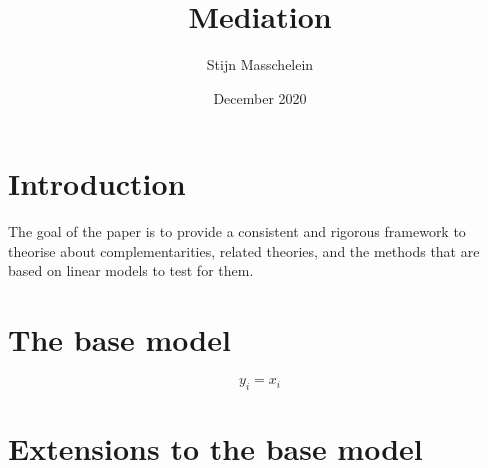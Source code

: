 \documentclass[]{article} %
\title{Mediation}
\author{Stijn Masschelein}
\date{December 2020}
\begin{document}
\maketitle

\section{Introduction}
The goal of the paper is to provide a consistent and rigorous framework to theorise about complementarities, related theories, and the methods that are based on linear models to test for them. 

\section{The base model}

\begin{equation}
\label{eq:management-function}
y_i = x_i 
\end{equation}

\section{Extensions to the base model}
\end{document}
